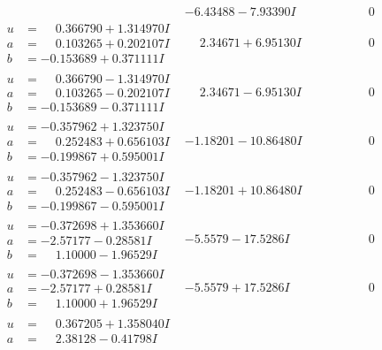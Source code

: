 \documentclass[1p]{elsarticle_modified}
\theoremstyle{definition}
\begin{document}
$$\begin{array}{c|c|c}
 & -6.43488 - 7.93390 I & \phantom{-0.000000 } 0 \\ \hline\begin{aligned}
u &= \phantom{-}0.366790 + 1.314970 I \\
a &= \phantom{-}0.103265 + 0.202107 I \\
b &= -0.153689 + 0.371111 I\end{aligned}
 & \phantom{-}2.34671 + 6.95130 I & \phantom{-0.000000 } 0 \\ \hline\begin{aligned}
u &= \phantom{-}0.366790 - 1.314970 I \\
a &= \phantom{-}0.103265 - 0.202107 I \\
b &= -0.153689 - 0.371111 I\end{aligned}
 & \phantom{-}2.34671 - 6.95130 I & \phantom{-0.000000 } 0 \\ \hline\begin{aligned}
u &= -0.357962 + 1.323750 I \\
a &= \phantom{-}0.252483 + 0.656103 I \\
b &= -0.199867 + 0.595001 I\end{aligned}
 & -1.18201 - 10.86480 I & \phantom{-0.000000 } 0 \\ \hline\begin{aligned}
u &= -0.357962 - 1.323750 I \\
a &= \phantom{-}0.252483 - 0.656103 I \\
b &= -0.199867 - 0.595001 I\end{aligned}
 & -1.18201 + 10.86480 I & \phantom{-0.000000 } 0 \\ \hline\begin{aligned}
u &= -0.372698 + 1.353660 I \\
a &= -2.57177 - 0.28581 I \\
b &= \phantom{-}1.10000 - 1.96529 I\end{aligned}
 & -5.5579 - 17.5286 I & \phantom{-0.000000 } 0 \\ \hline\begin{aligned}
u &= -0.372698 - 1.353660 I \\
a &= -2.57177 + 0.28581 I \\
b &= \phantom{-}1.10000 + 1.96529 I\end{aligned}
 & -5.5579 + 17.5286 I & \phantom{-0.000000 } 0 \\ \hline\begin{aligned}
u &= \phantom{-}0.367205 + 1.358040 I \\
a &= \phantom{-}2.38128 - 0.41798 I \\

\end{aligned}
\end{array}$$
\end{document}

